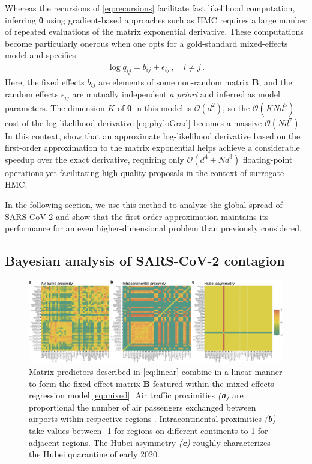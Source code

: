 \documentclass[9pt,twocolumn,twoside]{pnas-new}
\newcommand{\?}{\textbf{?}}
\newcommand{\ttheta}{\boldsymbol{\theta}}
\newcommand{\B}{\mathbf{B}}
\begin{document}
Whereas the recursions of \eqref{eq:recursions} facilitate fast
likelihood computation, inferring $\ttheta$ using gradient-based
approaches such as HMC requires a large number of repeated evaluations
of the matrix exponential derivative.  These computations become
particularly onerous when one opts for a gold-standard mixed-effects
model \cite{magee2023random} and specifies
\begin{align}\label{eq:mixed}
\log q_{ij} = b_{ij} + \epsilon_{ij} \,, \quad i\neq j\, .
\end{align} 
Here, the fixed effects $b_{ij}$ are elements of some non-random
matrix $\B$, and the random effects $\epsilon_{ij}$ are mutually
independent \emph{a priori} and inferred as model parameters.  The
dimension $K$ of $\ttheta$ in this model is $\mathcal{O}(d^2)$, so the $\mathcal{O}(KNd^5)$ cost of the log-likelihood derivative \eqref{eq:phyloGrad}
becomes a massive $\mathcal{O}(Nd^7)$.  In this context,
\cite{magee2023random} show that an approximate log-likelihood derivative based on the first-order approximation to the matrix exponential helps achieve a considerable speedup over the exact
derivative, requiring only $\mathcal{O}(d^4 + Nd^3)$ floating-point operations yet facilitating high-quality proposals in the context
of surrogate HMC.

In the following section, we use this method to analyze the global
spread of SARS-CoV-2 and show that the first-order approximation
maintains its performance for an even higher-dimensional problem than
previously considered.

\subsection*{Bayesian analysis of SARS-CoV-2 contagion}

\begin{figure}[!t]
	\centering
	\includegraphics[width=\linewidth]{fixedEffects.pdf}
	\vspace{-2em}
	\caption{Matrix predictors described in \eqref{eq:linear} combine in a linear manner to form the fixed-effect matrix $\B$ featured within the mixed-effects regression model \eqref{eq:mixed}.  Air traffic proximities \emph{(\textbf{a})} are proportional the number of air passengers exchanged between airports within respective regions \cite{holbrook2021massive}.  Intracontinental proximities \emph{(\textbf{b})} take values between -1 for regions on different continents to 1 for adjacent regions.  The Hubei asymmetry \emph{(\textbf{c})} roughly characterizes the Hubei quarantine of early 2020.}\label{fig:FE}
\end{figure}
\end{document}
